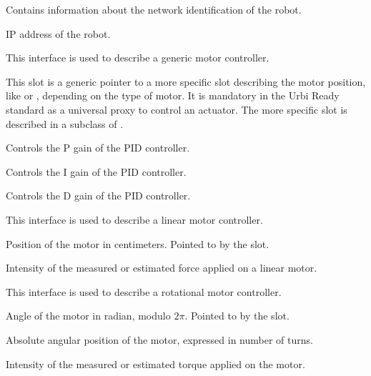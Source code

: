 
Contains information about the network identification of the robot.

\begin{slots}
  {%
    IP address of the robot.%
  }

\end{slots}


This interface is used to describe a generic motor controller.

\begin{slots}
  {%
    This slot is a generic pointer to a more specific slot describing
    the motor position, like  or ,
    depending on the type of motor. It is mandatory in the Urbi Ready
    standard as a universal proxy to control an actuator. The more
    specific slot is described in a subclass of .%
  }

  {%
    Controls the P gain of the PID controller.%
  }

  {%
    Controls the I gain of the PID controller.%
  }

  {%
    Controls the D gain of the PID controller.%
  }

\end{slots}



This interface is used to describe a linear motor controller.

\begin{slots}
  {%
    Position of the motor in centimeters.  Pointed to by the
     slot.%
  }

  {%
    Intensity of the measured or estimated force applied on a linear
    motor.%
  }

\end{slots}



This interface is used to describe a rotational motor controller.

\begin{slots}
  {%
    Angle of the motor in radian, modulo $2\pi$. Pointed to by the
     slot.%
  }

  {%
    Absolute angular position of the motor, expressed in number of
    turns.%
  }

  {%
    Intensity of the measured or estimated torque applied on the
    motor.%
  }

\end{slots}


